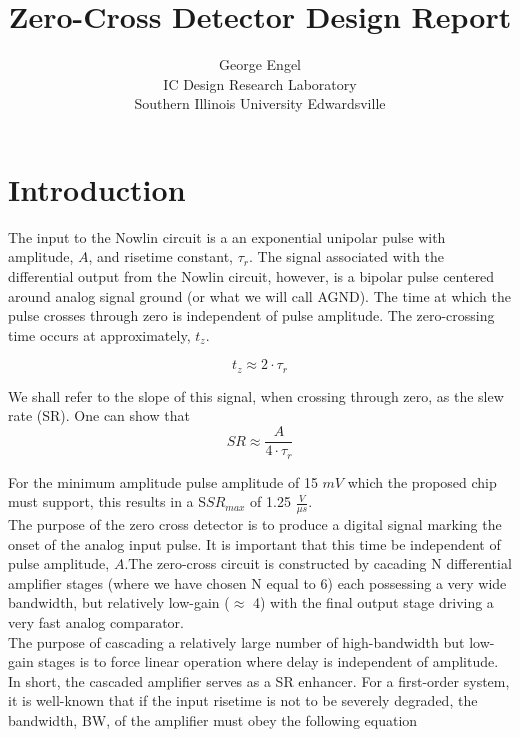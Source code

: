 \documentclass[12pt, onecolumn]{IEEEtran}
\author{George Engel\\
IC Design Research Laboratory\\
Southern Illinois University Edwardsville\\
}
\title{Zero-Cross Detector Design Report}
\begin{document}

\maketitle


\section*{Introduction}
The input to the Nowlin circuit is a an exponential unipolar pulse with amplitude, $A$, and risetime constant, $\tau_r$.  The signal associated with the differential output from the Nowlin circuit, however, is a bipolar pulse centered around analog signal ground (or what we will call AGND).  The time at which the pulse crosses through zero is independent of pulse amplitude. The zero-crossing time occurs at approximately, $t_z$. 

\begin{equation}
t_z \approx 2 \cdot \tau_r
\end{equation}

\noindent
We shall refer to the slope of this signal, when crossing through zero, as the slew rate (SR). One can show that \\

\begin{equation}
SR \approx \frac{A}{4 \cdot \tau_r}
\end{equation}

\noindent
For the minimum amplitude pulse amplitude of 15 $mV$ which the proposed chip must support, this results in a S$SR_{max}$ of 1.25 $\frac{V}{\mu s}$.\\


The purpose of the zero cross detector is to produce a digital signal marking the onset of the analog input pulse. It is important that this time be independent of pulse amplitude, $A$.The zero-cross circuit is constructed by cacading N differential amplifier stages (where we have chosen N equal to 6) each possessing a very wide bandwidth, but relatively low-gain ($\approx$ 4) with the final output stage driving a very fast analog comparator.\\  

The purpose of cascading a relatively large number of high-bandwidth but low-gain stages is to force linear operation where delay is independent of amplitude.  In short, the cascaded amplifier serves as a SR enhancer.  For a first-order system, it is well-known that if the input risetime is not to be severely degraded, the bandwidth, BW, of the amplifier must obey the following equation\\
\end{document}
